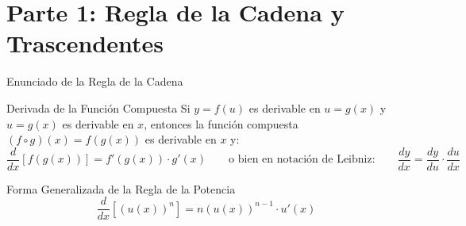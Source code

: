 \documentclass[aspectratio=169]{beamer}
\begin{document}
\begin{frame}[plain]
  \titlepage
\end{frame}

\section{Parte 1: Regla de la Cadena y Trascendentes}


\begin{frame}{Enunciado de la Regla de la Cadena}
  \begin{block}{Derivada de la Función Compuesta}
    Si $y = f(u)$ es derivable en $u = g(x)$ y $u = g(x)$ es derivable en $x$, entonces la función compuesta $(f \circ g)(x) = f(g(x))$ es derivable en $x$ y:
    $$\boxed{\frac{d}{dx}[f(g(x))] = f'(g(x)) \cdot g'(x)} \qquad\text{o bien en notación de Leibniz:}\qquad \boxed{\frac{dy}{dx} = \frac{dy}{du} \cdot \frac{du}{dx}}$$
  \end{block}

  \vspace{4pt}
  \begin{block}{Forma Generalizada de la Regla de la Potencia}
    $$\boxed{\frac{d}{dx}\left[(u(x))^n\right] = n(u(x))^{n-1} \cdot u'(x)}$$
  \end{block}
\end{frame}
\end{document}
